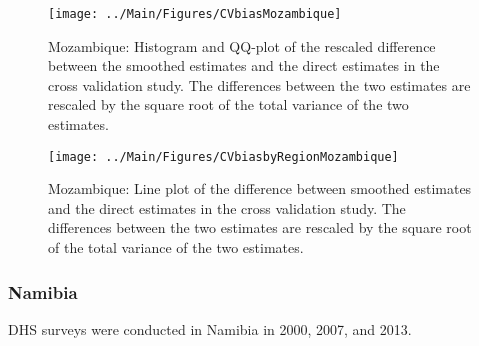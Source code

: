 \documentclass[12pt]{article}\usepackage[]{graphicx}\usepackage[]{color}
\newenvironment{knitrout}{}{} %
\begin{document}
\begin{knitrout}
\color{fgcolor}\begin{figure}[bht]

{\centering \texttt{[image: ../Main/Figures/CVbiasMozambique]} 

}

\caption[Mozambique]{Mozambique: Histogram and QQ-plot of the rescaled difference between the smoothed estimates and the direct estimates in the cross validation study. The differences between the two estimates are rescaled by the square root of the total variance of the two estimates.}\label{fig:unnamed-chunk-239}
\end{figure}


\end{knitrout}

\begin{knitrout}
\color{fgcolor}\begin{figure}[bht]

{\centering \texttt{[image: ../Main/Figures/CVbiasbyRegionMozambique]} 

}

\caption[Mozambique]{Mozambique: Line plot of the difference between smoothed estimates and the direct estimates in the cross validation study. The differences between the two estimates are rescaled by the square root of the total variance of the two estimates.}\label{fig:unnamed-chunk-240}
\end{figure}


\end{knitrout}


\clearpage
\subsubsection{Namibia}





DHS surveys were conducted in Namibia in 2000, 2007, and 2013.
\end{document}

